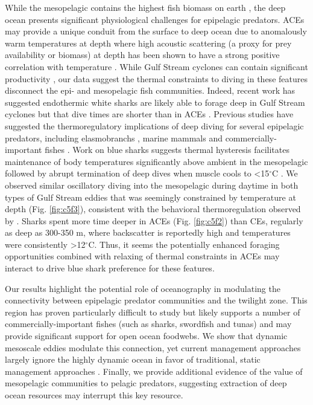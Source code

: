 While the mesopelagic contains the highest fish biomass on earth \citep{Irigoien2014}, the deep ocean presents significant physiological challenges for epipelagic predators. ACEs may provide a unique conduit from the surface to deep ocean due to anomalously warm temperatures at depth where high acoustic scattering (a proxy for prey availability or biomass) at depth has been shown to have a strong positive correlation with temperature \citep{Fennell2015}. While Gulf Stream cyclones can contain significant productivity \citep{Gaube2017DSR}, our data suggest the thermal constraints to diving in these features disconnect the epi- and mesopelagic fish communities. Indeed, recent work has suggested endothermic white sharks are likely able to forage deep in Gulf Stream cyclones but that dive times are shorter than in ACEs \citep{Gaube2018}. Previous studies have suggested the thermoregulatory implications of deep diving for several epipelagic predators, including elasmobranchs \citep{Thorrold2014}, marine mammals \citep{Tyack2006} and commercially-important fishes \citep{Carey1982}. Work on blue sharks suggests thermal hysteresis facilitates maintenance of body temperatures significantly above ambient in the mesopelagic followed by abrupt termination of deep dives when muscle cools to <15$^\circ$C \citep{Carey1990}. We observed similar oscillatory diving into the mesopelagic during daytime in both types of Gulf Stream eddies that was seemingly constrained by temperature at depth (Fig. \ref{fig:c5f3}), consistent with the behavioral thermoregulation observed by \cite{Carey1990}. Sharks spent more time deeper in ACEs (Fig. \ref{fig:c5f2}) than CEs, regularly as deep as 300-350 m, where backscatter is reportedly high \citep{Fennell2015} and temperatures were consistently >12$^\circ$C. Thus, it seems the potentially enhanced foraging opportunities combined with relaxing of thermal constraints in ACEs may interact to drive blue shark preference for these features.

Our results highlight the potential role of oceanography in modulating the connectivity between epipelagic predator communities and the twilight zone. This region has proven particularly difficult to study but likely supports a number of commercially-important fishes (such as sharks, swordfish and tunas) and may provide significant support for open ocean foodwebs. We show that dynamic mesoscale eddies modulate this connection, yet current management approaches largely ignore the highly dynamic ocean in favor of traditional, static management approaches \citep{Maxwell2015}. Finally, we provide additional evidence of the value of mesopelagic communities to pelagic predators, suggesting extraction of deep ocean resources may interrupt this key resource.

